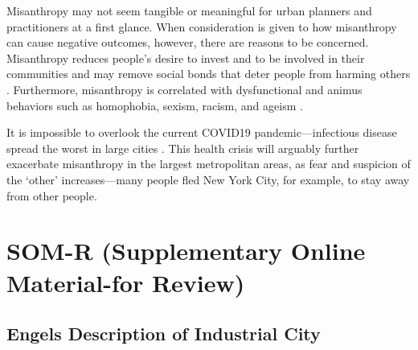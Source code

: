 \documentclass[11pt, letterpaper]{article}
\begin{document}
\begin{spacing}{1.4}
Misanthropy may not seem tangible or meaningful for urban planners and practitioners at a first
glance.  When consideration is given to how misanthropy can cause
negative outcomes, however, there are reasons to be concerned. Misanthropy reduces people's desire to invest and to be involved in their communities and may remove social bonds that deter people from harming others
 \citep{weaver2006,hirschi1993,fafchamps2006,walters2013}. Furthermore, misanthropy is correlated with dysfunctional and animus behaviors such as
 homophobia, sexism, racism, and ageism \citep{cattacin2006}. 
 
It is impossible to overlook the current COVID19 pandemic---infectious disease
spread the worst in large cities \citep{bettencourt10}. This health crisis will arguably further exacerbate misanthropy in the largest metropolitan areas, as fear and suspicion of the `other' increases---many people fled New York City, for example, to stay  away from other people. 







\clearpage

\section*{\LARGE SOM-R (Supplementary Online Material-for Review)}

\subsection{Engels Description of Industrial City}   


\end{spacing}
\end{document}
